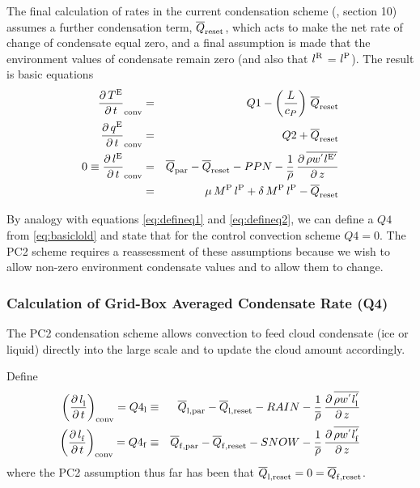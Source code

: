 \documentclass{UMDP_article}
\newcommand{\lsubsup}[2]{\ensuremath{l_{\rm{#1}}^{\rm{#2}}}}
\newcommand{\qsubsup}[2]{\ensuremath{q_{\rm{#1}}^{\rm{#2}}}}
\newcommand{\tsubsup}[2]{\ensuremath{T_{\rm{#1}}^{\rm{#2}}}}
\newcommand{\ov}{\overline}
\newcommand{\lp}{\left(}
\newcommand{\rp}{\right)}
\newcommand{\pardbyd}[2]{\ensuremath{\frac{\partial \, #1}{\partial \, #2}}}
\begin{document}
The final calculation of rates in the current condensation scheme (,
section 10) assumes a further condensation term, ${\ov{Q}}_{\rm{reset}}$, which
acts to make the net rate of change of condensate equal zero, and a final
assumption is made that the environment values of condensate remain zero (and
also that \lsubsup{ }{R} = \lsubsup{ }{P}). The
result is basic equations
%
\begin{eqnarray}
{\pardbyd{\tsubsup{ }{E}}{t}}_{\rm{conv}} & = & Q1 -
\lp { \frac{L}{c_{P}} } \rp \, {\ov{Q}}_{\rm{reset}}
\label{eq:basictold} \\ 
{\pardbyd{\qsubsup{ }{E}}{t}}_{\rm{conv}} & = & Q2 + {\ov{Q}}_{\rm{reset}}
\label{eq:basicqold} \\
0 \equiv {\pardbyd{\lsubsup{ }{E}}{t}}_{\rm{conv}} & = & {\ov{Q}}_{\rm{par}} - 
{\ov{Q}}_{\rm{reset}} - PPN
- \frac{1}{\ov{\rho}} \, \pardbyd{\ov{\rho w^{'} \lsubsup{ }{E'}}}{z} \nonumber \\
& = & 
\mu \, M^{\rm{P}} \, \lsubsup{ }{P} + \delta \, M^{\rm{P}} \, \lsubsup{ }{P} -
{\ov{Q}}_{\rm{reset}} 
\label{eq:basiclold} 
\end{eqnarray}

By analogy with equations \ref{eq:defineq1} and \ref{eq:defineq2}, we can
define a $Q4$ from \ref{eq:basiclold} and state that for the control
convection scheme $Q4 = 0$. The PC2 scheme requires a reassessment of these
assumptions because we wish to allow non-zero environment condensate values and
to allow them to change.

\subsubsection{Calculation of Grid-Box Averaged Condensate Rate (Q4)}
\label{subsect:q4calculation}

The PC2 condensation scheme allows convection to feed cloud condensate (ice or
liquid) directly into the large scale and to update the cloud amount accordingly.

Define
%
\begin{eqnarray}
\lp { \pardbyd{\lsubsup{l}{ }}{t} } \rp_{\rm{conv}} = Q4_{\rm{l}} & \equiv &  
{\ov{Q}}_{\rm{l, par}} - {\ov{Q}}_{\rm{l, reset}} - RAIN - 
\frac{1}{\ov{\rho}} \, \pardbyd{\ov{\rho w^{'} \lsubsup{l}{'}}}{z}
\label{eq:defineq4l} \\
\lp { \pardbyd{\lsubsup{f}{ }}{t} } \rp_{\rm{conv}} = Q4_{\rm{f}} & \equiv &  
{\ov{Q}}_{\rm{f, par}} - {\ov{Q}}_{\rm{f, reset}} - SNOW - 
\frac{1}{\ov{\rho}} \, \pardbyd{\ov{\rho w^{'} \lsubsup{f}{'}}}{z}
\label{eq:defineq4f}
\end{eqnarray}
%
where the PC2 assumption thus far has been that ${\ov{Q}}_{\rm{l, reset}} = 0
= {\ov{Q}}_{\rm{f, reset}}$.
\end{document}
